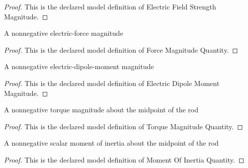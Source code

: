 \begin{proof}
  This is the declared model definition of Electric Field Strength Magnitude.
\end{proof}
\begin{definition}
  \label{def:physics:phyx-mini-0910:phyxminiproblems-problemphyxmini0910-forcemagnitudequantity}
  A nonnegative electric-force magnitude
\end{definition}
\begin{proof}
  This is the declared model definition of Force Magnitude Quantity.
\end{proof}
\begin{definition}
  \label{def:physics:phyx-mini-0910:phyxminiproblems-problemphyxmini0910-electricdipolemomentmagnitude}
  A nonnegative electric-dipole-moment magnitude
\end{definition}
\begin{proof}
  This is the declared model definition of Electric Dipole Moment Magnitude.
\end{proof}
\begin{definition}
  \label{def:physics:phyx-mini-0910:phyxminiproblems-problemphyxmini0910-torquemagnitudequantity}
  A nonnegative torque magnitude about the midpoint of the rod
\end{definition}
\begin{proof}
  This is the declared model definition of Torque Magnitude Quantity.
\end{proof}
\begin{definition}
  \label{def:physics:phyx-mini-0910:phyxminiproblems-problemphyxmini0910-momentofinertiaquantity}
  A nonnegative scalar moment of inertia about the midpoint of the rod
\end{definition}
\begin{proof}
  This is the declared model definition of Moment Of Inertia Quantity.
\end{proof}
